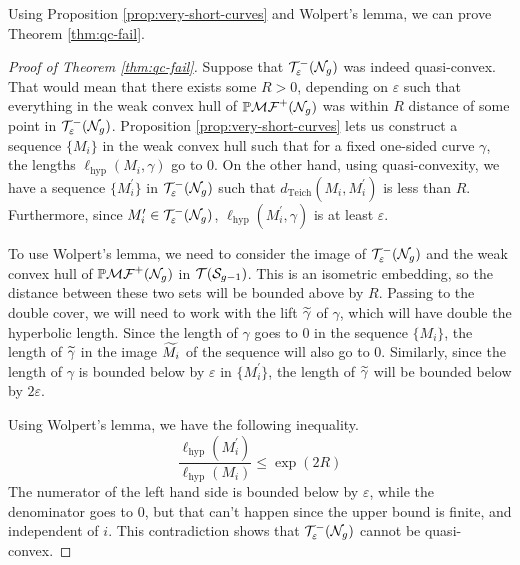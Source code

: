 \documentclass[12pt, reqno]{amsart}
\begin{document}
Using Proposition \ref{prop:very-short-curves} and Wolpert's lemma, we can prove Theorem
\ref{thm:qc-fail}.
\begin{proof}[Proof of Theorem \ref{thm:qc-fail}]
  Suppose that $\mathcal{T}_{\varepsilon}^{-}(\mathcal{N}_g)$ was indeed quasi-convex.
  That would mean that there exists some $R > 0$,
  depending on $\varepsilon$ such that everything in the weak convex hull of $\mathbb{P}\mathcal{MF}^+(\mathcal{N}_g)$ was within $R$
  distance of some point in $\mathcal{T}_{\varepsilon}^{-}(\mathcal{N}_g)$.  Proposition \ref{prop:very-short-curves} lets us construct a
  sequence $\{M_i\}$ in the weak convex hull such that for a fixed one-sided curve $\gamma$, the lengths
  $\ell_{\mathrm{hyp}}(M_i, \gamma)$ go to $0$. On the other hand, using quasi-convexity, we have a sequence
  $\{M_{i}^{\prime}\}$ in $\mathcal{T}_{\varepsilon}^{-}(\mathcal{N}_g)$ such that $d_{\mathrm{Teich}}(M_i, M_i^{\prime})$ is less than
  $R$. Furthermore, since $M_i^{\prime} \in \mathcal{T}_{\varepsilon}^{-}(\mathcal{N}_g)$, $\ell_{\mathrm{hyp}}(M_i^{\prime}, \gamma)$ is at
  least $\varepsilon$.

  To use Wolpert's lemma, we need to consider the image of $\mathcal{T}_{\varepsilon}^{-}(\mathcal{N}_g)$ and the weak convex hull of
  $\mathbb{P}\mathcal{MF}^+(\mathcal{N}_g)$ in $\mathcal{T}(\mathcal{S}_{g-1})$. This is an isometric embedding, so the distance between these two
  sets will be bounded above by $R$. Passing to the double cover, we will need to work with the lift
  $\widetilde{\gamma}$ of $\gamma$, which will have double the hyperbolic length.  Since the length of $\gamma$ goes
  to $0$ in the sequence $\{M_i\}$, the length of $\widetilde{\gamma}$ in the image $\widetilde{M_i}$ of the sequence will
  also go to $0$. Similarly, since the length of $\gamma$ is bounded below by $\varepsilon$ in
  $\{M_{i}^{\prime}\}$, the length of $\widetilde{\gamma}$ will be bounded below by $2 \varepsilon$.

  Using Wolpert's lemma, we have the following inequality.
  \begin{equation}
    \label{eq:20}
    \frac{\ell_{\mathrm{hyp}}(M_i^{\prime})}{\ell_{\mathrm{hyp}}(M_i)} \leq \exp(2R)
  \end{equation}
  The numerator of the left hand side is bounded below by $\varepsilon$, while the denominator goes to $0$, but that
  can't happen since the upper bound is finite, and independent of $i$.
  This contradiction shows that $\mathcal{T}_{\varepsilon}^{-}(\mathcal{N}_g)$ cannot be quasi-convex.
\end{proof}

\printbibliography
\end{document}
